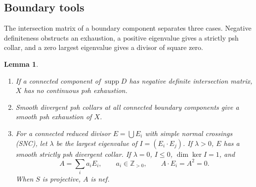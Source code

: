 \documentclass[11pt]{amsart}
\newtheorem{lemma}[theorem]{Lemma}
\theoremstyle{definition}
\theoremstyle{remark}
\numberwithin{equation}{section}
\newcommand{\supp}{\operatorname{supp}}
\begin{document}
\subsection{Boundary tools}\label{sec:surface-pair-reduction}

The intersection matrix of a boundary component separates three cases.
Negative definiteness obstructs an exhaustion, a positive eigenvalue
gives a strictly psh collar, and a zero largest eigenvalue gives a
divisor of square zero.

\begin{lemma}\label{lem:surface-boundary-tools}
\begin{enumerate}[label=\textup{(\roman*)},leftmargin=2.5em]
\item\label{item:negative-boundary}
If a connected component of $\supp D$ has negative definite
intersection matrix, $X$ has no continuous psh exhaustion.
\item\label{item:collar-gluing}
Smooth divergent psh collars at all connected boundary components
give a smooth psh exhaustion of $X$.
\item\label{item:matrix-alternatives}
For a connected reduced divisor $E=\bigcup E_i$ with simple normal
crossings (SNC), let $\lambda$
be the largest eigenvalue of $I=(E_i\cdot E_j)$. If $\lambda>0$,
$E$ has a smooth strictly psh divergent collar. If $\lambda=0$,
$I\le0$, $\dim\ker I=1$, and
\begin{equation}\label{eq:surface-null-boundary}
 A=\sum_i a_iE_i,\qquad a_i\in\mathbb Z_{>0},\qquad
 A\cdot E_i=A^2=0.
\end{equation}
When $S$ is projective, $A$ is nef.
\end{enumerate}
\end{lemma}
\end{document}
